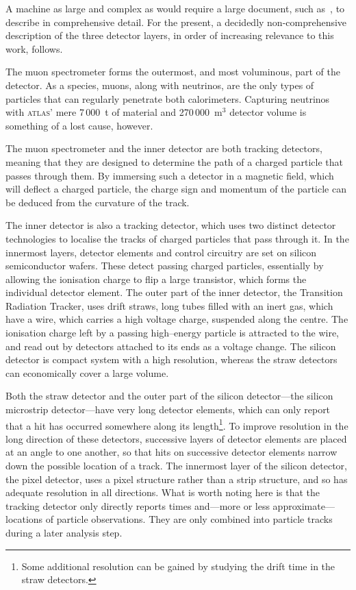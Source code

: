 A machine as large and complex as \atlas{} would require a large document, such as~\cite{detectorpaper}, to describe in comprehensive detail. For the present, a decidedly non-comprehensive description of the three detector layers, in order of increasing relevance to this work, follows.

The muon spectrometer forms the outermost, and most voluminous, part of the detector. As a species, muons, along with neutrinos, are the only types of particles that can regularly penetrate both calorimeters. Capturing neutrinos with \textsc{atlas}' mere 7\,000~t of material and 270\,000~m$^3$ detector volume \cite{atlasweb} is something of a lost cause, however.

The muon spectrometer and the inner detector are both tracking detectors, meaning that they are designed to determine the path of a charged particle that passes through them. By immersing such a detector in a magnetic field, which will deflect a charged particle, the charge sign and momentum of the particle can be deduced from the curvature of the track.

The inner detector is also a tracking detector, which uses two distinct detector technologies to localise the tracks of charged particles that pass through it. In the innermost layers, detector elements and control circuitry are set on silicon semiconductor wafers. These detect passing charged particles, essentially by allowing the ionisation charge to flip a large transistor, which forms the individual detector element. The outer part of the inner detector, the Transition Radiation Tracker, uses drift straws, long tubes filled with an inert gas, which have a wire, which carries a high voltage charge, suspended along the centre. The ionisation charge left by a passing high--energy particle is attracted to the wire, and read out by detectors attached to its ends as a voltage change. The silicon detector is compact system with a high resolution, whereas the straw detectors can economically cover a large volume.

Both the straw detector and the outer part of the silicon detector---the silicon microstrip detector---have very long detector elements, which can only report that a hit has occurred somewhere along its length\footnote{Some additional resolution can be gained by studying the drift time in the straw detectors.}. To improve resolution in the long direction of these detectors, successive layers of detector elements are placed at an angle to one another, so that hits on successive detector elements narrow down the possible location of a track. The innermost layer of the silicon detector, the pixel detector, uses a pixel structure rather than a strip structure, and so has adequate resolution in all directions. What is worth noting here is that the tracking detector only directly reports times and---more or less approximate---locations of particle observations. They are only combined into particle tracks during a later analysis step. 


